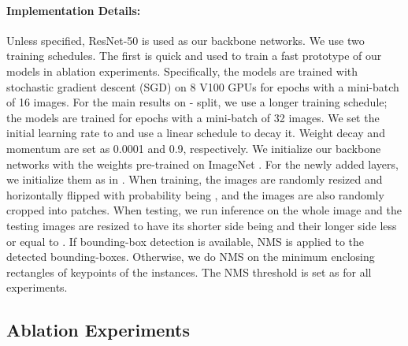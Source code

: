 \documentclass[10pt,twocolumn,letterpaper]{article}
\renewcommand{\texttt}[1]{}
\newcommand{\1}{{\mathbbm{1}}}
\begin{document}
{\paragraph{Implementation Details:} Unless specified, ResNet-50 \cite{he2016deep} is used as our backbone networks. We use two training schedules. The first is quick and used to train a fast prototype of our models in ablation experiments. Specifically, the models are trained with stochastic gradient descent (SGD) on 8 V100 GPUs for  epochs with a mini-batch of 16 images. For the main results on \texttt{test}-\texttt{dev} split, we use a longer training schedule; the models are trained for  epochs with a mini-batch of 32 images. We set the initial learning rate to  and use a linear schedule  to decay it. Weight decay and momentum are set as 0.0001 and 0.9, respectively. We initialize our backbone networks with the weights pre-trained on ImageNet \cite{deng2009imagenet}. For the newly added layers, we initialize them as in \cite{lin2017focal}. When training, the images are randomly resized and horizontally flipped with probability being , and the images are also randomly cropped into  patches. When testing, we run inference on the whole image and the testing images are resized to have its shorter side being  and their longer side less or equal to . If bounding-box detection is available, NMS is applied to the detected bounding-boxes. Otherwise, we do NMS on the minimum enclosing rectangles of keypoints of the instances. The NMS threshold is set as  for all experiments.
\subsection{Ablation Experiments}
}
\end{document}
